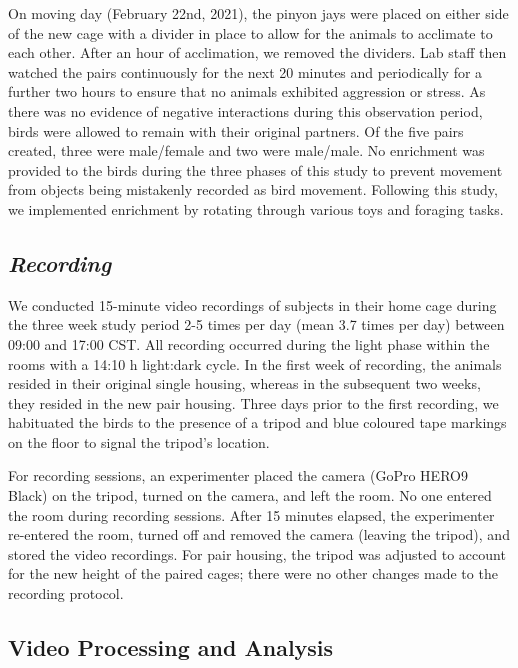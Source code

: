 \documentclass[
  pub]{apa6}
\begin{document}
On moving day (February 22nd, 2021), the pinyon jays were placed on either side of the new cage with a divider in place to allow for the animals to acclimate to each other. After an hour of acclimation, we removed the dividers. Lab staff then watched the pairs continuously for the next 20 minutes and periodically for a further two hours to ensure that no animals exhibited aggression or stress. As there was no evidence of negative interactions during this observation period, birds were allowed to remain with their original partners. Of the five pairs created, three were male/female and two were male/male. No enrichment was provided to the birds during the three phases of this study to prevent movement from objects being mistakenly recorded as bird movement. Following this study, we implemented enrichment by rotating through various toys and foraging tasks.

\subsection{\texorpdfstring{\emph{Recording}}{Recording}}\label{recording}

We conducted 15-minute video recordings of subjects in their home cage during the three week study period 2-5 times per day (mean 3.7 times per day) between 09:00 and 17:00 CST. All recording occurred during the light phase within the rooms with a 14:10 h light:dark cycle. In the first week of recording, the animals resided in their original single housing, whereas in the subsequent two weeks, they resided in the new pair housing. Three days prior to the first recording, we habituated the birds to the presence of a tripod and blue coloured tape markings on the floor to signal the tripod's location.

For recording sessions, an experimenter placed the camera (GoPro HERO9 Black) on the tripod, turned on the camera, and left the room. No one entered the room during recording sessions. After 15 minutes elapsed, the experimenter re-entered the room, turned off and removed the camera (leaving the tripod), and stored the video recordings. For pair housing, the tripod was adjusted to account for the new height of the paired cages; there were no other changes made to the recording protocol.

\subsection{Video Processing and Analysis}\label{video-processing-and-analysis}
\end{document}

